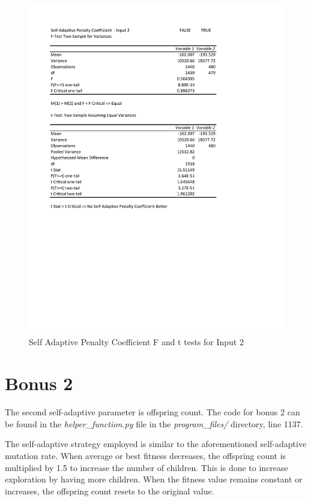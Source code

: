 \documentclass[times]{article}
\begin{document}
	\begin{figure}
		\caption{Self Adaptive Penalty Coefficient F and t tests for Input 2}
		\label{fig:saPenalty2}
		\includegraphics[width=\textwidth]{./t_test/S-APenaltyCoeff2}
	\end{figure}

	\section{Bonus 2}
	The second self-adaptive parameter is offspring count. The code for bonus 2 can be found in the \textit{helper\_function.py} file in the \textit{program\_files/} directory, line 1137.

	The self-adaptive strategy employed is similar to the aforementioned self-adaptive mutation rate. When average or best fitness decreases, the offspring count is multiplied by 1.5 to increase the number of children. This is done to increase exploration by having more children. When the fitness value remains constant or increases, the offspring count resets to the original value.
\end{document}
